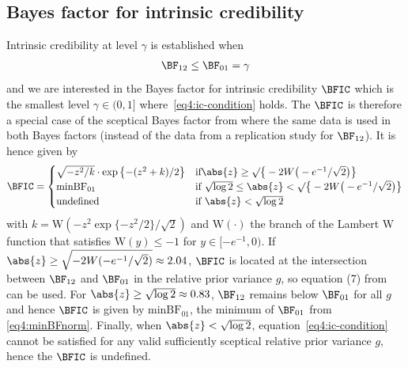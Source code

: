\begin{subappendices}
\section{Bayes factor for intrinsic credibility}
\label{app:BFIC}
Intrinsic credibility at level $\gamma$ is established when
\begin{align}
  \label{eq4:ic-condition}
  \BF_{12} \leq \BF_{01} = \gamma
\end{align}
and we are interested in the Bayes factor for intrinsic credibility $\BFIC$
which is the smallest level $\gamma \in (0, 1]$ where~\eqref{eq4:ic-condition}
holds. The $\BFIC$ is therefore a special case of the sceptical Bayes factor
from \citet{Pawel2020b} where the same data is used in both Bayes factors
(instead of the data from a replication study for $\BF_{12}$). It is hence given
by
\begin{align}
  \label{eq4:BFic}
  \BFIC =
  \begin{cases}
    \sqrt{-z^{2}/k}\cdot \exp\left\{-(z^{2} + k)/2\right\}
    & \text{if} \abs{z} \geq \surd\big\{-2 W\big(-e^{-1}/\sqrt2\big)\big\}\\
    \mbox{minBF}_{01} \
    & \text{if} ~ \sqrt{\log 2} \leq \abs{z} < \surd\big\{-2 W\big(-e^{-1}/\sqrt2\big)\big\} \\
    \text{undefined}
    & \text{if} ~ \abs{z} < \sqrt{\log 2}
  \end{cases}
\end{align}
with $k = \mathrm{W}(-z^{2} \exp\{-z^{2}/2\}/\sqrt{2})$ and $\mathrm{W}(\cdot)$
the branch of the Lambert W function that satisfies $\mathrm{W}(y) \leq -1$ for
$y \in [-e^{-1}, 0).$ If
$\abs{z} \geq \sqrt{-2 W(-e^{-1}/\sqrt2)} \approx 2.04$, $\BFIC$ is located at
the intersection between $\BF_{12}$ and $\BF_{01}$ in the relative prior
variance $g$, so equation (7) from \citet{Pawel2020b} can be used. For
$\abs{z} \geq \sqrt{\log 2} \approx 0.83$, $\BF_{12}$ remains below $\BF_{01}$
for all $g$ and hence $\BFIC$ is given by $\mbox{minBF}_{01}$, the minimum of
$\BF_{01}$ from \eqref{eq4:minBFnorm}. Finally, when $\abs{z} < \sqrt{\log 2}$,
equation~\eqref{eq4:ic-condition} cannot be satisfied for any valid sufficiently
sceptical relative prior variance $g$, hence the $\BFIC$ is undefined.

\end{subappendices}



